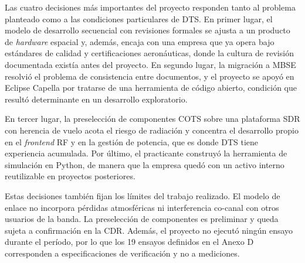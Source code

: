 Las cuatro decisiones más importantes del proyecto responden tanto al problema planteado como a las condiciones particulares de DTS. En primer lugar, el modelo de desarrollo secuencial con revisiones formales se ajusta a un producto de \textit{hardware} espacial y, además, encaja con una empresa que ya opera bajo estándares de calidad y certificaciones aeronáuticas, donde la cultura de revisión documentada existía antes del proyecto. En segundo lugar, la migración a MBSE resolvió el problema de consistencia entre documentos, y el proyecto se apoyó en Eclipse Capella por tratarse de una herramienta de código abierto, condición que resultó determinante en un desarrollo exploratorio.

En tercer lugar, la preselección de componentes COTS sobre una plataforma SDR con herencia de vuelo acota el riesgo de radiación y concentra el desarrollo propio en el \textit{frontend} RF y en la gestión de potencia, que es donde DTS tiene experiencia acumulada. Por último, el practicante construyó la herramienta de simulación en Python, de manera que la empresa quedó con un activo interno reutilizable en proyectos posteriores.

Estas decisiones también fijan los límites del trabajo realizado. El modelo de enlace no incorpora pérdidas atmosféricas ni interferencia co-canal con otros usuarios de la banda. La preselección de componentes es preliminar y queda sujeta a confirmación en la CDR. Además, el proyecto no ejecutó ningún ensayo durante el período, por lo que los 19 ensayos definidos en el Anexo D corresponden a especificaciones de verificación y no a mediciones.

